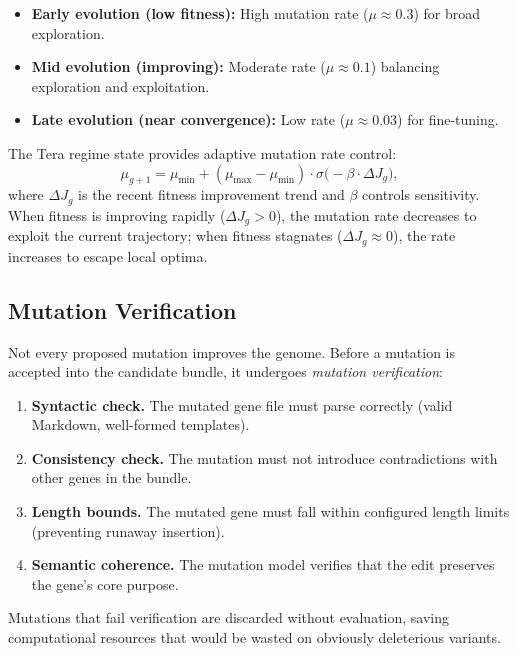 \begin{itemize}[leftmargin=1.5em]
  \item \textbf{Early evolution (low fitness):} High mutation rate ($\mu \approx 0.3$) for broad exploration.
  \item \textbf{Mid evolution (improving):} Moderate rate ($\mu \approx 0.1$) balancing exploration and exploitation.
  \item \textbf{Late evolution (near convergence):} Low rate ($\mu \approx 0.03$) for fine-tuning.
\end{itemize}

The Tera regime state provides adaptive mutation rate control:
\begin{equation}
\mu_{g+1} = \mu_{\min} + (\mu_{\max} - \mu_{\min}) \cdot \sigma\bigl(-\beta \cdot \Delta J_g\bigr),
\end{equation}
where $\Delta J_g$ is the recent fitness improvement trend and $\beta$ controls sensitivity. When fitness is improving rapidly ($\Delta J_g > 0$), the mutation rate decreases to exploit the current trajectory; when fitness stagnates ($\Delta J_g \approx 0$), the rate increases to escape local optima.

\subsection{Mutation Verification}

Not every proposed mutation improves the genome. Before a mutation is accepted into the candidate bundle, it undergoes \emph{mutation verification}:

\begin{enumerate}[leftmargin=1.5em]
  \item \textbf{Syntactic check.} The mutated gene file must parse correctly (valid Markdown, well-formed templates).
  \item \textbf{Consistency check.} The mutation must not introduce contradictions with other genes in the bundle.
  \item \textbf{Length bounds.} The mutated gene must fall within configured length limits (preventing runaway insertion).
  \item \textbf{Semantic coherence.} The mutation model verifies that the edit preserves the gene's core purpose.
\end{enumerate}

Mutations that fail verification are discarded without evaluation, saving computational resources that would be wasted on obviously deleterious variants.

